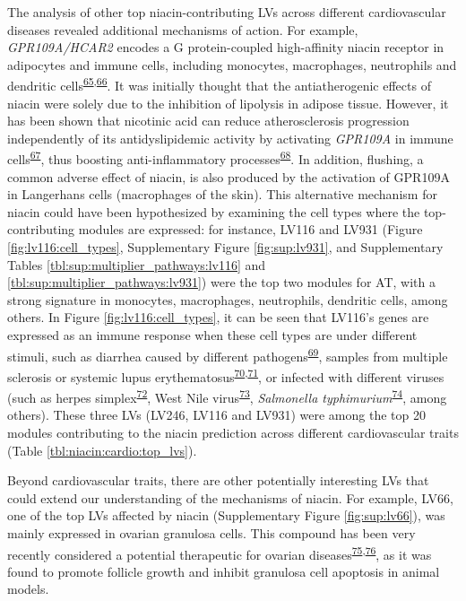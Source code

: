 \documentclass[
  a4paper,
]{article}
\begin{document}
The analysis of other top niacin-contributing LVs across different cardiovascular diseases revealed additional mechanisms of action.
For example, \emph{GPR109A/HCAR2} encodes a G protein-coupled high-affinity niacin receptor in adipocytes and immune cells, including monocytes, macrophages, neutrophils and dendritic cells\textsuperscript{\protect\hyperlink{ref-izbPw2kc}{65},\protect\hyperlink{ref-wI0IjT3i}{66}}.
It was initially thought that the antiatherogenic effects of niacin were solely due to the inhibition of lipolysis in adipose tissue.
However, it has been shown that nicotinic acid can reduce atherosclerosis progression independently of its antidyslipidemic activity by activating \emph{GPR109A} in immune cells\textsuperscript{\protect\hyperlink{ref-1Bz0jRHYo}{67}}, thus boosting anti-inflammatory processes\textsuperscript{\protect\hyperlink{ref-1DblG8swn}{68}}.
In addition, flushing, a common adverse effect of niacin, is also produced by the activation of GPR109A in Langerhans cells (macrophages of the skin).
This alternative mechanism for niacin could have been hypothesized by examining the cell types where the top-contributing modules are expressed:
for instance, LV116 and LV931 (Figure \ref{fig:lv116:cell_types}, Supplementary Figure \ref{fig:sup:lv931}, and Supplementary Tables \ref{tbl:sup:multiplier_pathways:lv116} and \ref{tbl:sup:multiplier_pathways:lv931}) were the top two modules for AT, with a strong signature in monocytes, macrophages, neutrophils, dendritic cells, among others.
In Figure \ref{fig:lv116:cell_types}, it can be seen that LV116's genes are expressed as an immune response when these cell types are under different stimuli, such as diarrhea caused by different pathogens\textsuperscript{\protect\hyperlink{ref-RliFvowC}{69}}, samples from multiple sclerosis or systemic lupus erythematosus\textsuperscript{\protect\hyperlink{ref-D5XBhzim}{70},\protect\hyperlink{ref-EnoqU4ga}{71}}, or infected with different viruses (such as herpes simplex\textsuperscript{\protect\hyperlink{ref-11eausmiy}{72}}, West Nile virus\textsuperscript{\protect\hyperlink{ref-mtMYROCN}{73}}, \emph{Salmonella typhimurium}\textsuperscript{\protect\hyperlink{ref-1kgcHkGm}{74}}, among others).
These three LVs (LV246, LV116 and LV931) were among the top 20 modules contributing to the niacin prediction across different cardiovascular traits (Table \ref{tbl:niacin:cardio:top_lvs}).

Beyond cardiovascular traits, there are other potentially interesting LVs that could extend our understanding of the mechanisms of niacin.
For example, LV66, one of the top LVs affected by niacin (Supplementary Figure \ref{fig:sup:lv66}), was mainly expressed in ovarian granulosa cells.
This compound has been very recently considered a potential therapeutic for ovarian diseases\textsuperscript{\protect\hyperlink{ref-kLRErKXz}{75},\protect\hyperlink{ref-TovvsrDr}{76}}, as it was found to promote follicle growth and inhibit granulosa cell apoptosis in animal models.
\end{document}
